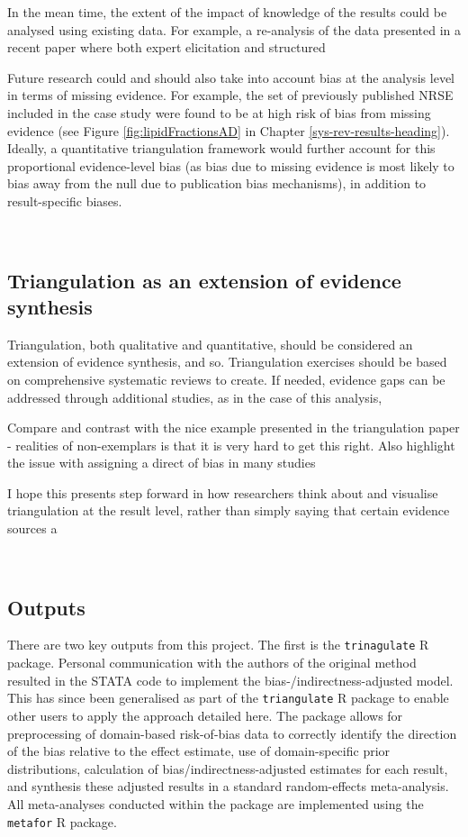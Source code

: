 \documentclass[a4paper, twoside]{templates/ociamthesis}
\begin{document}
In the mean time, the extent of the impact of knowledge of the results could be analysed using existing data. For example, a re-analysis of the data presented in a recent paper where both expert elicitation and structured

Future research could and should also take into account bias at the analysis level in terms of missing evidence. For example, the set of previously published NRSE included in the case study were found to be at high risk of bias from missing evidence (see Figure \ref{fig:lipidFractionsAD} in Chapter \ref{sys-rev-results-heading}). Ideally, a quantitative triangulation framework would further account for this proportional evidence-level bias (as bias due to missing evidence is most likely to bias away from the null due to publication bias mechanisms), in addition to result-specific biases.

~

\hypertarget{triangulation-as-an-extension-of-evidence-synthesis}{%
\subsection{Triangulation as an extension of evidence synthesis}\label{triangulation-as-an-extension-of-evidence-synthesis}}

Triangulation, both qualitative and quantitative, should be considered an extension of evidence synthesis, and so. Triangulation exercises should be based on comprehensive systematic reviews to create. If needed, evidence gaps can be addressed through additional studies, as in the case of this analysis,

Compare and contrast with the nice example presented in the triangulation paper - realities of non-exemplars is that it is very hard to get this right. Also highlight the issue with assigning a direct of bias in many studies

I hope this presents step forward in how researchers think about and visualise triangulation at the result level, rather than simply saying that certain evidence sources a

~

\hypertarget{tri-software}{%
\subsection{Outputs}\label{tri-software}}

There are two key outputs from this project. The first is the \texttt{trinagulate} R package. Personal communication with the authors of the original method resulted in the STATA code to implement the bias-/indirectness-adjusted model. This has since been generalised as part of the \texttt{triangulate} R package to enable other users to apply the approach detailed here. The package allows for preprocessing of domain-based risk-of-bias data to correctly identify the direction of the bias relative to the effect estimate, use of domain-specific prior distributions, calculation of bias/indirectness-adjusted estimates for each result, and synthesis these adjusted results in a standard random-effects meta-analysis. All meta-analyses conducted within the package are implemented using the \texttt{metafor} R package.
\end{document}

